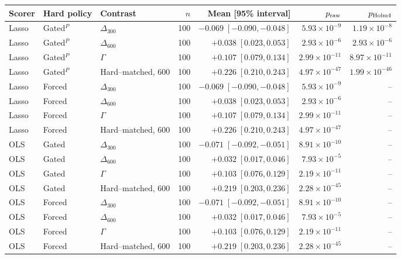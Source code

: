 \begin{tabular}{lllrrrr}
\toprule
Scorer & Hard policy & Contrast & $n$ & Mean [95\% interval] & $p_{\rm raw}$ & $p_{\rm Holm4}$ \\
\midrule
Lasso & Gated$^{P}$ & $\Delta_{300}$ & 100 & $-0.069\;[-0.090,-0.048]$ & $5.93\times10^{-9}$ & $1.19\times10^{-8}$ \\
Lasso & Gated$^{P}$ & $\Delta_{600}$ & 100 & $+0.038\;[0.023,0.053]$ & $2.93\times10^{-6}$ & $2.93\times10^{-6}$ \\
Lasso & Gated$^{P}$ & $\Gamma$ & 100 & $+0.107\;[0.079,0.134]$ & $2.99\times10^{-11}$ & $8.97\times10^{-11}$ \\
Lasso & Gated$^{P}$ & Hard--matched, $600$ & 100 & $+0.226\;[0.210,0.243]$ & $4.97\times10^{-47}$ & $1.99\times10^{-46}$ \\
\midrule
Lasso & Forced & $\Delta_{300}$ & 100 & $-0.069\;[-0.090,-0.048]$ & $5.93\times10^{-9}$ & -- \\
Lasso & Forced & $\Delta_{600}$ & 100 & $+0.038\;[0.023,0.053]$ & $2.93\times10^{-6}$ & -- \\
Lasso & Forced & $\Gamma$ & 100 & $+0.107\;[0.079,0.134]$ & $2.99\times10^{-11}$ & -- \\
Lasso & Forced & Hard--matched, $600$ & 100 & $+0.226\;[0.210,0.243]$ & $4.97\times10^{-47}$ & -- \\
\midrule
OLS & Gated & $\Delta_{300}$ & 100 & $-0.071\;[-0.092,-0.051]$ & $8.91\times10^{-10}$ & -- \\
OLS & Gated & $\Delta_{600}$ & 100 & $+0.032\;[0.017,0.046]$ & $7.93\times10^{-5}$ & -- \\
OLS & Gated & $\Gamma$ & 100 & $+0.103\;[0.076,0.129]$ & $2.19\times10^{-11}$ & -- \\
OLS & Gated & Hard--matched, $600$ & 100 & $+0.219\;[0.203,0.236]$ & $2.28\times10^{-45}$ & -- \\
\midrule
OLS & Forced & $\Delta_{300}$ & 100 & $-0.071\;[-0.092,-0.051]$ & $8.91\times10^{-10}$ & -- \\
OLS & Forced & $\Delta_{600}$ & 100 & $+0.032\;[0.017,0.046]$ & $7.93\times10^{-5}$ & -- \\
OLS & Forced & $\Gamma$ & 100 & $+0.103\;[0.076,0.129]$ & $2.19\times10^{-11}$ & -- \\
OLS & Forced & Hard--matched, $600$ & 100 & $+0.219\;[0.203,0.236]$ & $2.28\times10^{-45}$ & -- \\
\bottomrule
\end{tabular}
